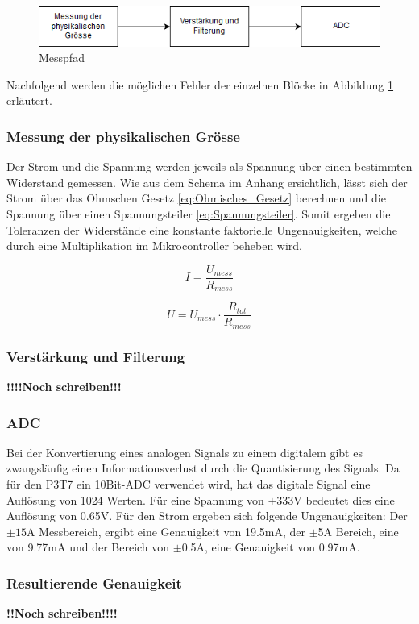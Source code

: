 \begin{figure}[htb]

	\includegraphics[width=160mm]{images/genauigkeit.png}

	\caption{Messpfad} %
  
	\label{fig:genauigkeit}

\end{figure}

Nachfolgend werden die möglichen Fehler der einzelnen Blöcke in Abbildung \ref{fig:genauigkeit} erläutert.

\subsubsection*{Messung der physikalischen Grösse}
Der Strom und die Spannung werden jeweils als Spannung über einen bestimmten Widerstand gemessen. Wie aus dem Schema im Anhang ersichtlich, lässt sich der Strom über das Ohmschen Gesetz \ref{eq:Ohmisches_Gesetz} berechnen und die Spannung über einen Spannungsteiler \ref{eq:Spannungsteiler}. Somit ergeben die Toleranzen der Widerstände eine konstante faktorielle Ungenauigkeiten, welche durch eine Multiplikation im Mikrocontroller beheben wird.


\begin{equation}
I = \frac{U_{mess}}{R_{mess}}
\label{eq:Ohmisches_Gesetz}
\end{equation}

\begin{equation}
U = U_{mess} \cdot \frac{R_{tot}}{R_{mess}}
\label{eq:Spannungsteiler}
\end{equation}

\subsubsection*{Verstärkung und Filterung}
\textbf{!!!!Noch schreiben!!!}

\subsubsection*{ADC}
Bei der Konvertierung eines analogen Signals zu einem digitalem gibt es zwangsläufig einen Informationsverlust durch die Quantisierung des Signals. Da für den P3T7 ein 10Bit-ADC verwendet wird, hat das digitale Signal eine Auflösung von 1024 Werten. Für eine Spannung von $\pm$333V bedeutet dies eine Auflösung von 0.65V. Für den Strom ergeben sich folgende Ungenauigkeiten: Der $\pm 15$A Messbereich, ergibt eine Genauigkeit von 19.5mA, der $\pm$5A Bereich, eine von 9.77mA und der Bereich von $\pm$0.5A, eine Genauigkeit von 0.97mA.

\subsubsection*{Resultierende Genauigkeit} 
\textbf{!!Noch schreiben!!!!}






\pagebreak